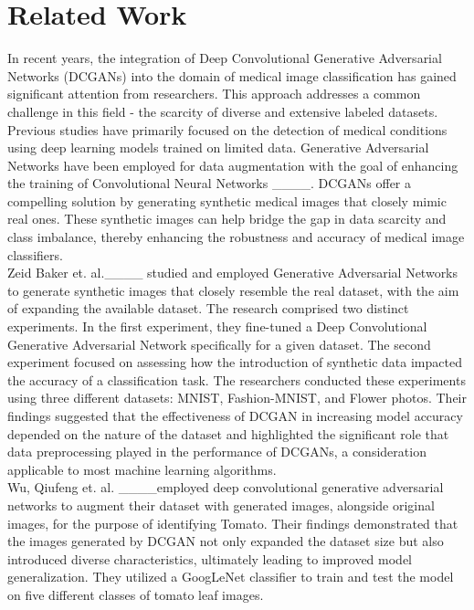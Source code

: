 \section{Related Work}
In recent years, the integration of Deep Convolutional Generative Adversarial Networks (DCGANs) into the domain of medical image classification has gained significant attention from researchers. This approach addresses a common challenge in this field - the scarcity of diverse and extensive labeled datasets. Previous studies have primarily focused on the detection of medical conditions using deep learning models trained on limited data. Generative Adversarial Networks have been employed for data augmentation with the goal of enhancing the training of Convolutional Neural Networks ____. DCGANs offer a compelling solution by generating synthetic medical images that closely mimic real ones. These synthetic images can help bridge the gap in data scarcity and class imbalance, thereby enhancing the robustness and accuracy of medical image classifiers.\\
Zeid Baker et. al.____ studied and employed Generative Adversarial Networks to generate synthetic images that closely resemble the real dataset, with the aim of expanding the available dataset. The research comprised two distinct experiments. In the first experiment, they fine-tuned a Deep Convolutional Generative Adversarial Network  specifically for a given dataset. The second experiment focused on assessing how the introduction of synthetic data impacted the accuracy of a classification task. The researchers conducted these experiments using three different datasets: MNIST, Fashion-MNIST, and Flower photos. Their findings suggested that the effectiveness of DCGAN in increasing model accuracy depended on the nature of the dataset and highlighted the significant role that data preprocessing played in the performance of DCGANs, a consideration applicable to most machine learning algorithms.\\ 
Wu, Qiufeng et. al. ____employed deep convolutional generative adversarial networks to augment their dataset with generated images, alongside original images, for the purpose of identifying Tomato. Their findings demonstrated that the images generated by DCGAN not only expanded the dataset size but also introduced diverse characteristics, ultimately leading to improved model generalization. They utilized a GoogLeNet classifier to train and test the model on five different classes of tomato leaf images.